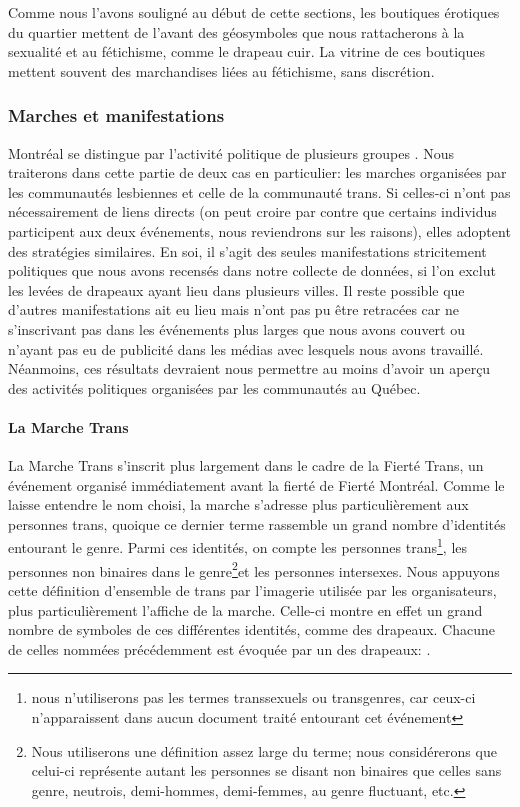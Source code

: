 Comme nous l'avons souligné au début de cette sections, les boutiques érotiques du quartier mettent de l'avant des géosymboles que nous rattacherons à la sexualité et au fétichisme, comme le drapeau cuir.
La vitrine de ces boutiques mettent souvent des marchandises liées au fétichisme, sans discrétion.

\subsubsection{Marches et manifestations}
\label{subsec:label}
Montréal se distingue par l'activité politique de plusieurs groupes \lgbt{}.
Nous traiterons dans cette partie de deux cas en particulier: les marches organisées par les communautés lesbiennes et celle de la communauté trans.
Si celles-ci n'ont pas nécessairement de liens directs (on peut croire par contre que certains individus participent aux deux événements, nous reviendrons sur les raisons), elles adoptent des stratégies similaires.
En soi, il s'agit des seules manifestations stricitement politiques que nous avons recensés dans notre collecte de données, si l'on exclut les levées de drapeaux ayant lieu dans plusieurs villes.
Il reste possible que d'autres manifestations ait eu lieu mais n'ont pas pu être retracées car ne s'inscrivant pas dans les événements plus larges que nous avons couvert ou n'ayant pas eu de publicité dans les médias avec lesquels nous avons travaillé.
Néanmoins, ces résultats devraient nous permettre au moins d'avoir un aperçu des activités politiques organisées par les communautés \lgbt{} au Québec.

\paragraph{La Marche Trans}
\label{subsubsec:marchetrans}
La Marche Trans s'inscrit plus largement dans le cadre de la Fierté Trans, un événement organisé immédiatement avant la fierté de Fierté Montréal.
Comme le laisse entendre le nom choisi, la marche s'adresse plus particulièrement aux personnes trans, quoique ce dernier terme rassemble un grand nombre d'identités entourant le genre.
Parmi ces identités, on compte les personnes trans\footnote{nous n'utiliserons pas les termes transsexuels ou transgenres, car ceux-ci n'apparaissent dans aucun document traité entourant cet événement}, les personnes non binaires dans le genre\footnote{Nous utiliserons une définition assez large du terme; nous considérerons que celui-ci représente autant les personnes se disant non binaires que celles sans genre, neutrois, demi-hommes, demi-femmes, au genre fluctuant, etc.\citep[see][]{Barker2015}}et les personnes intersexes.
Nous appuyons cette définition d'ensemble de trans par l'imagerie utilisée par les organisateurs, plus particulièrement l'affiche de la marche.
Celle-ci montre en effet un grand nombre de symboles de ces différentes identités, comme des drapeaux.
Chacune de celles nommées précédemment est évoquée par un des drapeaux: .

